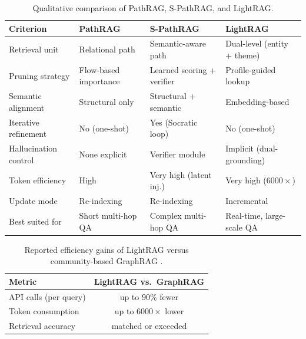\documentclass[12pt,a4paper,oneside]{report}
\begin{document}
\begin{table}[htbp]
    \centering
    \caption{Qualitative comparison of PathRAG, S-PathRAG, and LightRAG.}
    \label{tab:qualitative}
    \small
    \begin{tabularx}{\textwidth}{@{}lXXX@{}}
        \toprule
        \textbf{Criterion} & \textbf{PathRAG} & \textbf{S-PathRAG} & \textbf{LightRAG} \\
        \midrule
        Retrieval unit        & Relational path         & Semantic-aware path        & Dual-level (entity + theme) \\
        Pruning strategy      & Flow-based importance   & Learned scoring + verifier & Profile-guided lookup \\
        Semantic alignment    & Structural only         & Structural + semantic      & Embedding-based \\
        Iterative refinement  & No (one-shot)           & Yes (Socratic loop)        & No (one-shot) \\
        Hallucination control & None explicit           & Verifier module            & Implicit (dual-grounding) \\
        Token efficiency      & High                    & Very high (latent inj.)    & Very high ($6000\times$) \\
        Update mode           & Re-indexing             & Re-indexing                & Incremental \\
        Best suited for       & Short multi-hop QA      & Complex multi-hop QA       & Real-time, large-scale QA \\
        \bottomrule
    \end{tabularx}
\end{table}

\begin{table}[htbp]
    \centering
    \caption{Reported efficiency gains of LightRAG versus community-based
             GraphRAG \citep{guo2025lightrag}.}
    \label{tab:efficiency}
    \small
    \begin{tabular}{@{}lc@{}}
        \toprule
        \textbf{Metric}           & \textbf{LightRAG vs.\ GraphRAG} \\
        \midrule
        API calls (per query)     & up to $90\%$ fewer \\
        Token consumption         & up to $6000\times$ lower \\
        Retrieval accuracy        & matched or exceeded \\
        \bottomrule
    \end{tabular}
\end{table}
\end{document}
